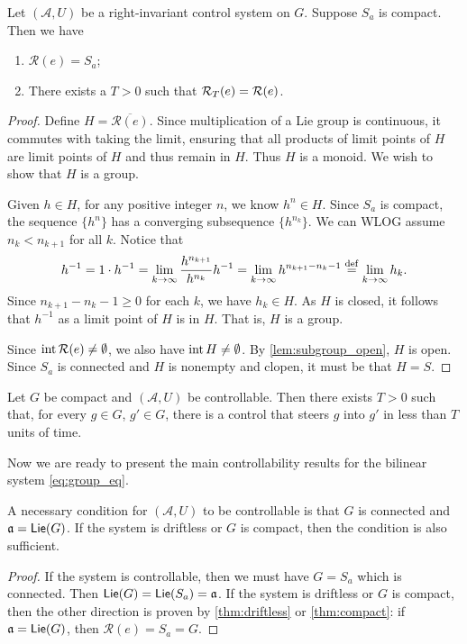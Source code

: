 \documentclass[12pt,class=article,crop=false]{standalone}
\begin{document}
\begin{theorem}\label{thm:compact} 
Let $ (\mathcal{A},U)$ be a right-invariant control system on $G$. Suppose $ S_a$ is compact. Then we have
 \begin{enumerate}[label=(\roman*)]
	\item $ \mathcal{R}( e) = S_a$;
	\item There exists a $ T>0$ such that  $ \mathcal{R}_T( e)  = \mathcal{R}( e) $.
\end{enumerate}
\end{theorem}
\begin{proof}
Define $ H = \overline{ \mathcal{R}( e) }$. Since multiplication of a Lie group is continuous, it commutes with taking the limit, ensuring that all products of limit points of $ H$ are limit points of  $ H$ and thus remain in $ H$. Thus  $ H$ is a monoid. We wish to show that $ H$ is a group.

Given $ h \in H$, for any positive integer $ n$, we know $ h^{n} \in H$. Since $ S_a$ is compact, the sequence  $ \{h^{n}\} $ has a converging subsequence $ \{h^{n_k}\} $. We can WLOG assume $ n_k < n_{k+1}$ for all $ k$. Notice that
\begin{align*}
	h^{-1} = 1 \cdot h^{-1} = \lim_{ k \to \infty} \frac{h^{n_{k+1}}}{ h^{n_k}} h^{-1} = \lim_{ k \to \infty} h^{n_{k+1}-n_k -1} \defeq \lim_{ k \to \infty} h_k .
\end{align*}
Since $ n_{k+1} - n_k -1 \geq 0$ for each $ k$, we have $ h_k \in H$. As $ H$ is closed, it follows that  $ h^{-1}$ as a limit point of $ H$ is in $ H$. That is, $ H$ is a group.

Since $ \operatorname{int} \mathcal{R}( e) \neq \emptyset $, we also have $ \operatorname{int} H \neq \emptyset$. By \cref{lem:subgroup_open}, $ H$ is open. Since $ S_a$ is connected and  $ H$ is nonempty and clopen, it must be that  $ H = S$.
\end{proof}
\begin{corollary}
Let $ G$ be compact and  $ ( \mathcal{ A}, U)$ be controllable. Then there exists $ T>0$ such that, for every  $ g \in G$, $ g' \in G$, there is a control that steers $ g$ into  $ g'$ in less than  $ T$ units of time.
\end{corollary}

Now we are ready to present the main controllability results for the bilinear system \cref{eq:group_eq}.

\begin{theorem}
A necessary condition for $ ( \mathcal{ A},U)$ to be controllable is that $ G$ is connected and  $ \mathfrak{a} = \mathsf{Lie}( G) $. If the system is driftless or $ G$  is compact, then the condition is also sufficient.
\end{theorem}
\begin{proof}
If the system is controllable, then we must have $ G= S_a$ which is connected. Then $ \mathsf{Lie}( G) = \mathsf{Lie}( S_a) = \mathfrak{a}$. If the system is driftless or $G$ is compact, then the other direction is proven by  \cref{thm:driftless} or  \cref{thm:compact}: if $ \mathfrak{a} = \mathsf{Lie}( G) $, then $ \mathcal{R}( e) = S_a = G $. 
\end{proof}
\end{document}
